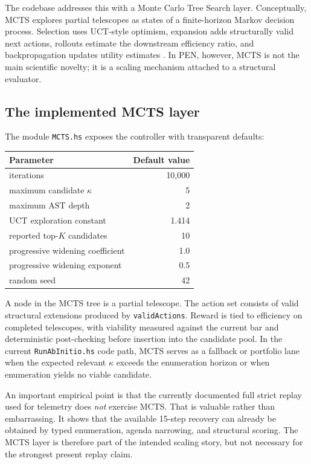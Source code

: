 \documentclass[pdflatex,sn-mathphys,Numbered]{sn-jnl}
\theoremstyle{thmstyleone}
\theoremstyle{thmstylethree}
\theoremstyle{thmstyletwo}
\begin{document}
The codebase addresses this with a Monte Carlo Tree Search layer. Conceptually, MCTS explores partial telescopes as states of a finite-horizon Markov decision process. Selection uses UCT-style optimism, expansion adds structurally valid next actions, rollouts estimate the downstream efficiency ratio, and backpropagation updates utility estimates \cite{kocsis,browne}. In PEN, however, MCTS is not the main scientific novelty; it is a scaling mechanism attached to a structural evaluator.

\subsection{The implemented MCTS layer}

The module \texttt{MCTS.hs} exposes the controller with transparent defaults:
\begin{center}
\begin{tabular}{@{}lr@{}}
\toprule
Parameter & Default value \\
\midrule
iterations & 10,000 \\
maximum candidate $\kappa$ & 5 \\
maximum AST depth & 2 \\
UCT exploration constant & 1.414 \\
reported top-$K$ candidates & 10 \\
progressive widening coefficient & 1.0 \\
progressive widening exponent & 0.5 \\
random seed & 42 \\
\bottomrule
\end{tabular}
\end{center}

A node in the MCTS tree is a partial telescope. The action set consists of valid structural extensions produced by \texttt{validActions}. Reward is tied to efficiency on completed telescopes, with viability measured against the current bar and deterministic post-checking before insertion into the candidate pool. In the current \texttt{RunAbInitio.hs} code path, MCTS serves as a fallback or portfolio lane when the expected relevant $\kappa$ exceeds the enumeration horizon or when enumeration yields no viable candidate.

An important empirical point is that the currently documented full strict replay used for telemetry does \emph{not} exercise MCTS. That is valuable rather than embarrassing. It shows that the available 15-step recovery can already be obtained by typed enumeration, agenda narrowing, and structural scoring. The MCTS layer is therefore part of the intended scaling story, but not necessary for the strongest present replay claim.
\end{document}
